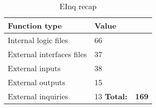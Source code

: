 \begin{table}[!h]
\centering
\caption{EInq recap}
\label{einq-recap}
\begin{tabularx}{\linewidth}{XXc}
\hline
\textbf{Function type}            & \textbf{Value}      \\ \hline
Internal logic files       & 66 \\
External interfaces files  & 37 \\
External inputs            & 38 \\
External outputs           & 15 \\
External inquiries         & 13
\textbf{Total:}            & \textbf{169}
\end{tabularx}
\end{table}